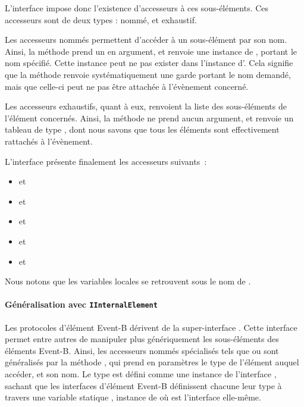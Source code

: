 L'interface  impose donc l'existence d'accesseurs à ces sous-éléments.
Ces accesseurs sont de deux types : nommé, et exhaustif.

Les accesseurs nommés permettent d'accéder à un sous-élément par son nom.
Ainsi, la méthode  prend un  en argument, et renvoie une instance de , portant le nom spécifié.
Cette instance peut ne pas exister dans l'instance d'.
Cela signifie que la méthode  renvoie systématiquement une garde portant le nom demandé, mais que celle-ci %
peut ne pas être attachée à l'évènement concerné.

Les accesseurs exhaustifs, quant à eux, renvoient la liste des sous-éléments de l'élément concernés.
Ainsi, la méthode  ne prend aucun argument, et renvoie un tableau de type , dont nous savons que tous %
les éléments sont effectivement rattachés à l'évènement.

L'interface  présente finalement les accesseurs suivants~:

\begin{itemize}
    \item {} et 
    \item {} et 
    \item {} et 
    \item {} et 
    \item {} et 
\end{itemize}

Nous notons que les variables locales se retrouvent sous le nom de .

\paragraph{Généralisation avec \texttt{IInternalElement}}

Les protocoles d'élément Event-B dérivent de la super-interface .
Cette interface permet entre autres de manipuler plus génériquement les sous-éléments des éléments Event-B.
Ainsi, les accesseurs nommés spécialisés tels que  ou  sont généralisés par %
la méthode , qui prend en paramètres le type de l'élément auquel accéder, et son nom.
Le type est défini comme une instance de l'interface , %
sachant que les interfaces d'élément Event-B définissent chacune leur type à travers une variable statique , instance de %
 où  est l'interface elle-même.


